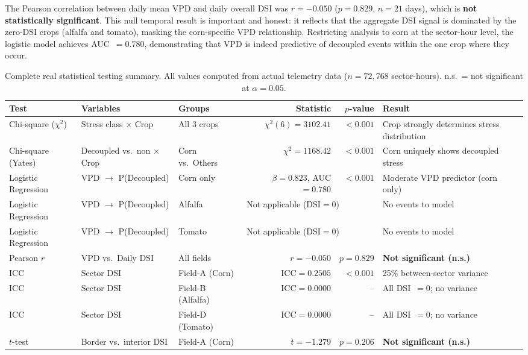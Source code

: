 \documentclass[review,12pt]{elsarticle}
\begin{document}
The Pearson correlation between daily mean VPD and daily overall DSI was $r = -0.050$ ($p = 0.829$, $n = 21$ days), which is \textbf{not statistically significant}. This null temporal result is important and honest: it reflects that the aggregate DSI signal is dominated by the zero-DSI crops (alfalfa and tomato), masking the corn-specific VPD relationship. Restricting analysis to corn at the sector-hour level, the logistic model achieves AUC~$= 0.780$, demonstrating that VPD is indeed predictive of decoupled events within the one crop where they occur.

\begin{table}[H]
\centering
\caption{Complete real statistical testing summary. All values computed from actual telemetry data ($n=72{,}768$ sector-hours). n.s.~= not significant at $\alpha=0.05$.}
\label{tab:statistical_tests}
\begin{tabular}{lllrrl}
\toprule
\textbf{Test} & \textbf{Variables} & \textbf{Groups} & \textbf{Statistic} & \textbf{$p$-value} & \textbf{Result} \\
\midrule
Chi-square ($\chi^2$) & Stress class $\times$ Crop & All 3 crops & $\chi^2(6)=3102.41$ & $<0.001$ & Crop strongly determines stress distribution \\
Chi-square (Yates) & Decoupled vs.~non $\times$ Crop & Corn vs.~Others & $\chi^2=1168.42$ & $<0.001$ & Corn uniquely shows decoupled stress \\
\midrule
Logistic Regression & VPD $\to$ P(Decoupled) & Corn only & $\beta=0.823$, AUC$=0.780$ & $<0.001$ & Moderate VPD predictor (corn only) \\
Logistic Regression & VPD $\to$ P(Decoupled) & Alfalfa & \multicolumn{2}{l}{Not applicable (DSI$=0$)} & No events to model \\
Logistic Regression & VPD $\to$ P(Decoupled) & Tomato & \multicolumn{2}{l}{Not applicable (DSI$=0$)} & No events to model \\
\midrule
Pearson $r$ & VPD vs.~Daily DSI & All fields & $r=-0.050$ & $p=0.829$ & \textbf{Not significant (n.s.)} \\
\midrule
ICC & Sector DSI & Field-A (Corn) & ICC$=0.2505$ & $<0.001$ & 25\% between-sector variance \\
ICC & Sector DSI & Field-B (Alfalfa) & ICC$=0.0000$ & -- & All DSI~$=0$; no variance \\
ICC & Sector DSI & Field-D (Tomato) & ICC$=0.0000$ & -- & All DSI~$=0$; no variance \\
\midrule
$t$-test & Border vs.~interior DSI & Field-A (Corn) & $t=-1.279$ & $p=0.206$ & \textbf{Not significant (n.s.)} \\
\bottomrule
\end{tabular}
\end{table}
\end{document}
